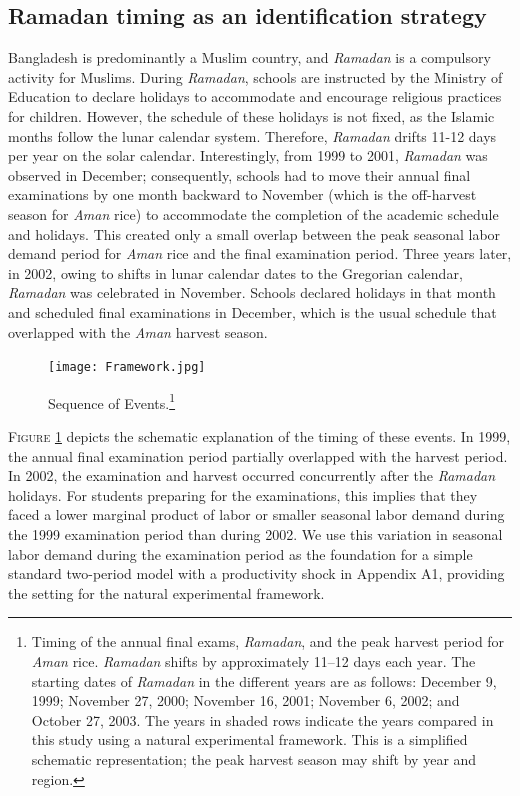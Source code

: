 \documentclass[12pt,letterpaper]{article}
\newcommand{\0}{\ensuremath{\mbox{\boldmath $0$}}}
\begin{document}
\subsection{Ramadan timing as an identification strategy}

Bangladesh is predominantly a Muslim country, and \textit{Ramadan} is a compulsory activity for Muslims. During \textit{Ramadan}, schools are instructed by the Ministry of Education to declare holidays to accommodate and encourage religious practices for children. However, the schedule of these holidays is not fixed, as the Islamic months follow the lunar calendar system. Therefore, \textit{Ramadan} drifts 11-12 days per year on the solar calendar. Interestingly, from 1999 to 2001, \textit{Ramadan} was observed in December; consequently, schools had to move their annual final examinations by one month backward to November (which is the off-harvest season for \textit{Aman} rice) to accommodate the completion of the academic schedule and holidays. This created only a small overlap between the peak seasonal labor demand period for \textit{Aman} rice and the final examination period. Three years later, in 2002, owing to shifts in lunar calendar dates to the Gregorian calendar, \textit{Ramadan} was celebrated in November. Schools declared holidays in that month and scheduled final examinations in December, which is the usual schedule that overlapped with the \textit{Aman} harvest season. 


\begin{figure}[h!]
\centering
\texttt{[image: Framework.jpg]}\\
\caption{Sequence of Events.\footnote{Timing of the annual final exams, \textit{Ramadan}, and the peak harvest period for \textit{Aman} rice. \textit{Ramadan} shifts by approximately 11–12 days each year. The starting dates of \textit{Ramadan} in the different years are as follows: December 9, 1999; November 27, 2000; November 16, 2001; November 6, 2002; and October 27, 2003. The years in shaded rows indicate the years compared in this study using a natural experimental framework. This is a simplified schematic representation; the peak harvest season may shift by year and region.}}
\label{schedule}
\end{figure}

\textsc{\small Figure \ref{schedule}} depicts the schematic explanation of the timing of these events. In 1999, the annual final examination period partially overlapped with the harvest period. In 2002, the examination and harvest occurred concurrently after the \textit{Ramadan} holidays. For students preparing for the examinations, this implies that they faced a lower marginal product of labor or smaller seasonal labor demand during the 1999 examination period than during 2002. We use this variation in seasonal labor demand during the examination period as the foundation for a simple standard two-period model with a productivity shock in Appendix A1, providing the setting for the natural experimental framework.
\end{document}
